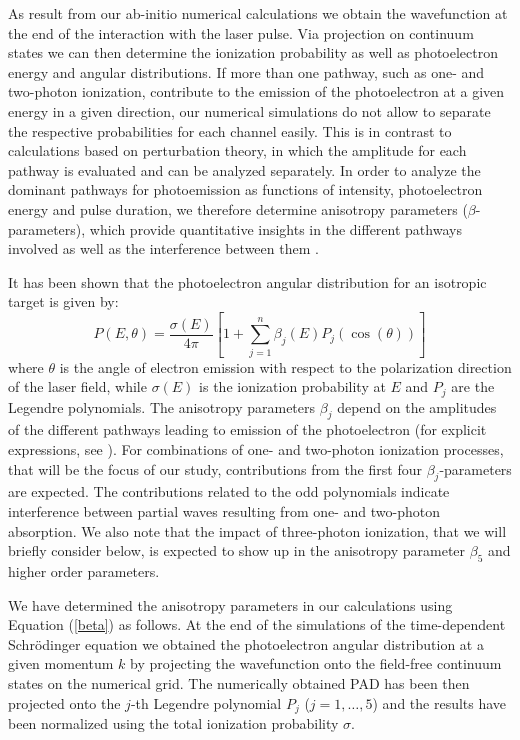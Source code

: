 As result from our ab-initio numerical calculations we obtain the wavefunction at the end of the interaction with the laser pulse. Via projection on continuum states we can then determine the ionization probability as well as photoelectron energy and angular distributions. If more than one pathway, such as one- and two-photon ionization, contribute to the emission of the photoelectron at a given energy in a given direction, our numerical simulations do not allow to separate the respective probabilities for each channel easily. This is in contrast to calculations based on perturbation theory, in which the amplitude for each pathway is evaluated and can be analyzed separately. In order to analyze the dominant pathways for photoemission as functions of intensity, photoelectron energy and pulse duration, we therefore determine anisotropy parameters ($\beta$-parameters), which provide quantitative insights in the different pathways involved as well as the interference between them \cite{grum-grzhimailo2015,douguet2016,boll2019}.

It has been shown \cite{laplanche1986} that the photoelectron angular distribution for an isotropic target is given by: 
%
\begin{equation}
\label{beta}
    P(E,\theta) = \frac{\sigma(E)}{4\pi} \left[ 1 + \sum\limits_{j=1}^{n} \beta_j(E) P_j(\cos(\theta)) \right]
\end{equation}
%
where $\theta$ is the angle of electron emission with respect to the polarization direction of the laser field, while $\sigma(E)$ is the ionization probability at $E$ and $P_j$ are the Legendre polynomials. The anisotropy parameters $\beta_j$ depend on the amplitudes of the different pathways leading to emission of the photoelectron (for explicit expressions, see  \cite{grum-grzhimailo2015}). For combinations of one- and two-photon ionization processes, that will be the focus of our study, contributions from the first four $\beta_j$-parameters are expected. The contributions related to the odd polynomials indicate interference between partial waves resulting from one- and two-photon absorption. We also note that the impact of three-photon ionization, that we will briefly consider below, is expected to show up in the anisotropy parameter $\beta_5$ and higher order parameters.

We have determined the anisotropy parameters in our calculations using Equation (\ref{beta}) as follows. At the end of the simulations of the time-dependent Schr\"odinger equation we obtained the photoelectron angular distribution at a given momentum $k$ by projecting the wavefunction onto the field-free continuum states on the numerical grid. The numerically obtained PAD has been then projected onto the $j$-th  Legendre polynomial $P_j$ ($j = 1, \ldots, 5$) and the results have been normalized using the total ionization probability $\sigma$.  

